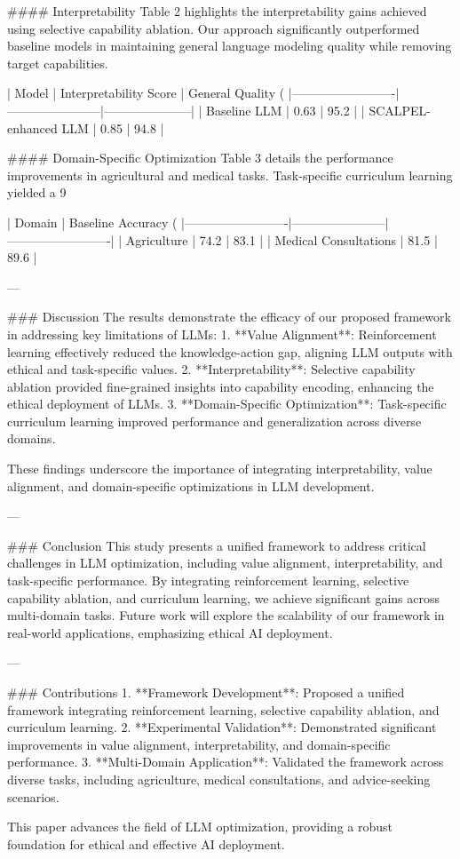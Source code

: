 #### Interpretability
Table 2 highlights the interpretability gains achieved using selective capability ablation. Our approach significantly outperformed baseline models in maintaining general language modeling quality while removing target capabilities.

| Model                   | Interpretability Score | General Quality (%
|-------------------------|-----------------------|---------------------|
| Baseline LLM            | 0.63                  | 95.2                |
| SCALPEL-enhanced LLM    | 0.85                  | 94.8                |

#### Domain-Specific Optimization
Table 3 details the performance improvements in agricultural and medical tasks. Task-specific curriculum learning yielded a 9%

| Domain                  | Baseline Accuracy (%
|-------------------------|-----------------------|-------------------------|
| Agriculture             | 74.2                  | 83.1                    |
| Medical Consultations   | 81.5                  | 89.6                    |

---

### Discussion
The results demonstrate the efficacy of our proposed framework in addressing key limitations of LLMs:
1. **Value Alignment**: Reinforcement learning effectively reduced the knowledge-action gap, aligning LLM outputs with ethical and task-specific values.
2. **Interpretability**: Selective capability ablation provided fine-grained insights into capability encoding, enhancing the ethical deployment of LLMs.
3. **Domain-Specific Optimization**: Task-specific curriculum learning improved performance and generalization across diverse domains.

These findings underscore the importance of integrating interpretability, value alignment, and domain-specific optimizations in LLM development.

---

### Conclusion
This study presents a unified framework to address critical challenges in LLM optimization, including value alignment, interpretability, and task-specific performance. By integrating reinforcement learning, selective capability ablation, and curriculum learning, we achieve significant gains across multi-domain tasks. Future work will explore the scalability of our framework in real-world applications, emphasizing ethical AI deployment.

---

### Contributions
1. **Framework Development**: Proposed a unified framework integrating reinforcement learning, selective capability ablation, and curriculum learning.
2. **Experimental Validation**: Demonstrated significant improvements in value alignment, interpretability, and domain-specific performance.
3. **Multi-Domain Application**: Validated the framework across diverse tasks, including agriculture, medical consultations, and advice-seeking scenarios.

This paper advances the field of LLM optimization, providing a robust foundation for ethical and effective AI deployment.